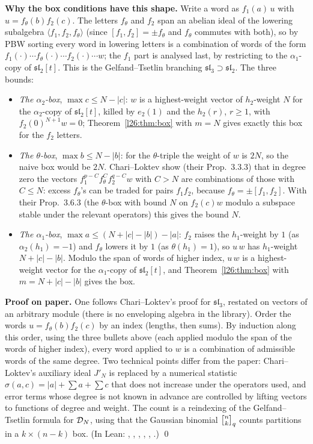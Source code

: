 \textbf{Why the box conditions have this shape.} Write a word as $f_1(a)\,u$ with $u=f_\theta(b)f_2(c)$. The letters $f_\theta$ and
$f_2$ span an abelian ideal of the lowering subalgebra $\langle f_1,f_2,f_\theta\rangle$ (since $[f_1,f_2]=\pm f_\theta$ and $f_\theta$
commutes with both), so by PBW sorting every word in lowering letters is a combination of words of the form $f_1(\cdot)\cdots
f_\theta(\cdot)\cdots f_2(\cdot)\cdots w$; the $f_1$ part is analysed last, by restricting to the $\alpha_1$-copy of $\mathfrak{sl}_2[t]$.
This is the Gelfand--Tsetlin branching $\mathfrak{sl}_3\supset\mathfrak{sl}_2$. The three bounds:
\begin{itemize}
\item \emph{The $\alpha_2$-box}, $\max c\le N-|c|$: $w$ is a highest-weight vector of $h_2$-weight $N$ for the $\alpha_2$-copy of
  $\mathfrak{sl}_2[t]$, killed by $e_2(1)$ and the $h_2(r)$, $r\ge1$, with $f_2(0)^{N+1}w=0$; Theorem~\ref{l26:thm:box} with $m=N$ gives
  exactly this box for the $f_2$ letters.
\item \emph{The $\theta$-box}, $\max b\le N-|b|$: for the $\theta$-triple the weight of $w$ is $2N$, so the naive box would be $2N$.
  Chari--Loktev show (their Prop.~3.3.3) that in degree zero the vectors $f_1^{p-C}f_\theta^Cf_2^{q-C}w$ with $C>N$ are combinations of
  those with $C\le N$: excess $f_\theta$'s can be traded for pairs $f_1f_2$, because $f_\theta=\pm[f_1,f_2]$. With their Prop.~3.6.3
  (the $\theta$-box with bound $N$ on $f_2(c)w$ modulo a subspace stable under the relevant operators) this gives the bound $N$.
\item \emph{The $\alpha_1$-box}, $\max a\le(N+|c|-|b|)-|a|$: $f_2$ raises the $h_1$-weight by $1$ (as $\alpha_2(h_1)=-1$) and $f_\theta$
  lowers it by $1$ (as $\theta(h_1)=1$), so $u\,w$ has $h_1$-weight $N+|c|-|b|$. Modulo the span of words of higher index, $u\,w$ is
  a highest-weight vector for the $\alpha_1$-copy of $\mathfrak{sl}_2[t]$, and Theorem~\ref{l26:thm:box} with $m=N+|c|-|b|$ gives the box.
\end{itemize}

\textbf{Proof on paper.} One follows Chari--Loktev's proof for $\mathfrak{sl}_3$, restated on vectors of an arbitrary module
(there is no enveloping algebra in the library). Order the words $u=f_\theta(b)f_2(c)$ by an index (lengths, then sums). By
induction along this order, using the three bullets above (each applied modulo the span of the words of higher index), every word
applied to $w$ is a combination of admissible words of the same degree. Two technical points differ from the paper: Chari--Loktev's
auxiliary ideal $J'_N$ is replaced by a numerical statistic $\sigma(a,c)=|a|+\sum a+\sum c$ that does not increase under the
operators used, and error terms whose degree is not known in advance are controlled by lifting vectors to functions of degree and
weight. The count is a reindexing of the Gelfand--Tsetlin formula for $\mathcal D_N$, using that the Gaussian binomial
$\ltwentysixqb{n}{k}$ counts partitions in a $k\times(n-k)$ box. (In Lean: , , ,
, , .) \qed

